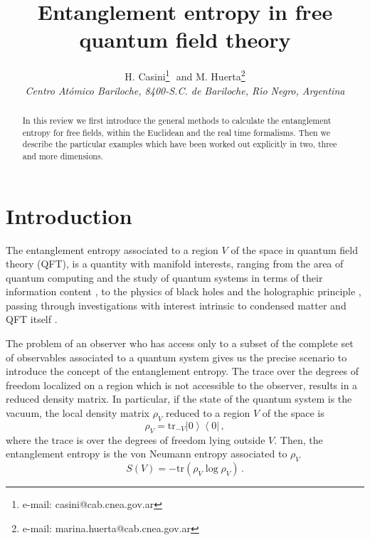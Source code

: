 \documentclass[11pt]{article}
\begin{document}
\date{}
\title{Entanglement entropy in free quantum field theory}
\author{H. Casini\footnote{e-mail: casini@cab.cnea.gov.ar}\,\, 
and
M. Huerta\footnote{e-mail: marina.huerta@cab.cnea.gov.ar} \\
{\sl Centro At\'omico Bariloche,
8400-S.C. de Bariloche, R\'{\i}o Negro, Argentina}}
\maketitle
\begin{abstract}
In this review we first introduce the general methods to calculate the entanglement entropy for free fields, within the Euclidean and the real time formalisms.  Then we describe the particular examples which have been worked out explicitly in two, three and more dimensions. 
\end{abstract}

\newpage
\tableofcontents
\newpage
\section{Introduction}

The entanglement entropy associated to a region $V$ of the space in quantum field theory (QFT), is a quantity with manifold interests, ranging from the area of quantum computing and the study of quantum systems in terms of their information content \cite{chuang,upper}, to the physics of black holes \cite{bombelli,cw,srednicki} and the holographic principle \cite{holo}, passing through investigations with interest intrinsic to condensed matter \cite{cm,ami,vidal} and QFT itself \cite{cc,qft,ch1}. 

The problem of an observer who has access only to a subset of the complete set of observables associated to a quantum system gives us the precise scenario to introduce the concept of the entanglement entropy. 
The trace over the degrees of freedom localized on a region which is not accessible to the observer, results in a reduced density matrix. In particular, if the state of the quantum system is the vacuum,  
the local density matrix $\rho_V$ reduced to a region $V$ of the space is
\begin{equation}
\rho_V=\textrm{tr}_{-V}\left|0\right\rangle\left\langle 0\right|\,,
\end{equation}
where the trace is over the degrees of freedom lying outside $V$. Then, the entanglement entropy is the von Neumann entropy associated to $\rho_V$
\begin{equation}
S(V)=-\textrm{tr}(\rho_V\log \rho_V)\,.
\end{equation}
\end{document}
